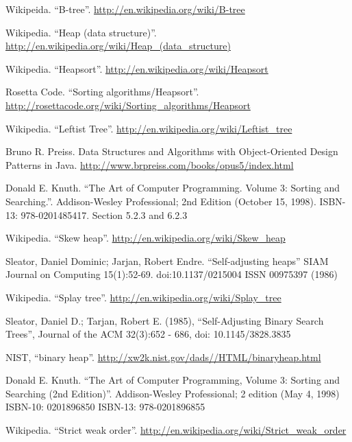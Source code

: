 \begin{thebibliography}{99}

Wikipeida. ``B-tree''. \url{http://en.wikipedia.org/wiki/B-tree}


Wikipedia. ``Heap (data structure)''. \url{http://en.wikipedia.org/wiki/Heap_(data_structure)}

Wikipedia. ``Heapsort''. \url{http://en.wikipedia.org/wiki/Heapsort}

Rosetta Code. ``Sorting algorithms/Heapsort''.  \url{http://rosettacode.org/wiki/Sorting_algorithms/Heapsort}

Wikipedia. ``Leftist Tree''. \url{http://en.wikipedia.org/wiki/Leftist_tree}

Bruno R. Preiss. Data Structures and Algorithms with Object-Oriented Design Patterns in Java. \url{http://www.brpreiss.com/books/opus5/index.html}

Donald E. Knuth. ``The Art of Computer Programming. Volume 3: Sorting and Searching.''. Addison-Wesley Professional;
2nd Edition (October 15, 1998). ISBN-13: 978-0201485417. Section 5.2.3 and 6.2.3

Wikipedia. ``Skew heap''. \url{http://en.wikipedia.org/wiki/Skew_heap}

Sleator, Daniel Dominic; Jarjan, Robert Endre. ``Self-adjusting heaps'' SIAM Journal on Computing 15(1):52-69. doi:10.1137/0215004 ISSN 00975397 (1986)

Wikipedia. ``Splay tree''. \url{http://en.wikipedia.org/wiki/Splay_tree}

Sleator, Daniel D.; Tarjan, Robert E. (1985), ``Self-Adjusting Binary Search Trees'', Journal of the ACM 32(3):652 - 686, doi: 10.1145/3828.3835

NIST, ``binary heap''. \url{http://xw2k.nist.gov/dads//HTML/binaryheap.html}

Donald E. Knuth. ``The Art of Computer Programming, Volume 3: Sorting and Searching (2nd Edition)''. Addison-Wesley Professional; 2 edition (May 4, 1998) ISBN-10: 0201896850 ISBN-13: 978-0201896855

Wikipedia. ``Strict weak order''. \url{http://en.wikipedia.org/wiki/Strict_weak_order}


\end{thebibliography}
